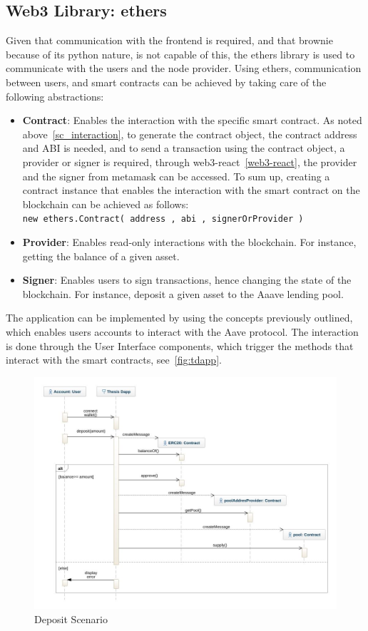 \documentclass[11pt,a4paper]{report}
\begin{document}
\subsection{Web3 Library: ethers}\label{ethers}
Given that communication with the frontend is required, and that brownie because of its python nature, is not capable of this, the ethers library is used to communicate with the users and the node provider. Using ethers, communication between users, and smart contracts can be achieved by taking care of the following abstractions:
\begin{itemize}
	\item \textbf{Contract}: Enables the interaction with the specific smart contract. As noted above~\ref{sc_interaction}, to generate the contract object, the contract address and ABI is needed, and to send a transaction using the contract object, a provider or signer is required, through web3-react~\ref{web3-react}, the provider and the signer from metamask can be accessed. To sum up, creating a contract instance that enables the interaction with the smart contract on the blockchain can be achieved as follows:\\
	\verb|new ethers.Contract( address , abi , signerOrProvider )|
	\item \textbf{Provider}: Enables read-only interactions with the blockchain. For instance, getting the balance of a given asset.
	\item \textbf{Signer}: Enables users to sign transactions, hence changing the state of the blockchain. For instance, deposit a given asset to the Aaave lending pool.
\end{itemize}
The application can be implemented by using the concepts previously outlined, which enables users accounts to interact with the Aave protocol. The interaction is done through the User Interface components, which trigger the methods that interact with the smart contracts, see~\ref{fig:tdapp}.
\begin{figure}[htp]
	\centering
	\includegraphics[width=1\textwidth]{./images/sequence-deposit}
	\caption{Deposit Scenario}
	\label{fig:sd-deposit}
\end{figure}
\end{document}
